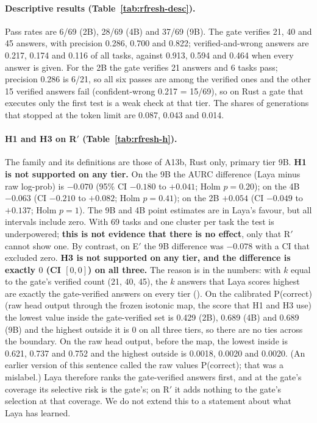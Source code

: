 \documentclass[11pt,a4paper]{article}
\newcommand{\code}[1]{\texttt{\detokenize{#1}}}
\begin{document}
\paragraph{Descriptive results (Table~\ref{tab:rfresh-desc}).} Pass rates are 6/69 (2B), 28/69 (4B) and 37/69 (9B). The gate verifies 21, 40 and 45 answers, with precision 0.286, 0.700 and 0.822; verified-and-wrong answers are 0.217, 0.174 and 0.116 of all tasks, against 0.913, 0.594 and 0.464 when every answer is given. For the 2B the gate verifies 21 answers and 6 tasks pass; precision 0.286 is 6/21, so all six passes are among the verified ones and the other 15 verified answers fail (confident-wrong 0.217 = 15/69), so on Rust a gate that executes only the first test is a weak check at that tier. The shares of generations that stopped at the token limit are 0.087, 0.043 and 0.014.

\paragraph{H1 and H3 on R$'$ (Table~\ref{tab:rfresh-h}).} The family and its definitions are those of A13b, Rust only, primary tier 9B. \textbf{H1 is not supported on any tier.} On the 9B the AURC difference (Laya minus raw log-prob) is $-0.070$ (95\% CI $-0.180$ to $+0.041$; Holm $p=0.20$); on the 4B $-0.063$ (CI $-0.210$ to $+0.082$; Holm $p=0.41$); on the 2B $+0.054$ (CI $-0.049$ to $+0.137$; Holm $p=1$). The 9B and 4B point estimates are in Laya's favour, but all intervals include zero. With 69 tasks and one cluster per task the test is underpowered; \textbf{this is not evidence that there is no effect}, only that R$'$ cannot show one. By contrast, on E$'$ the 9B difference was $-0.078$ with a CI that excluded zero.
\textbf{H3 is not supported on any tier, and the difference is exactly $0$ (CI $[0,0]$) on all three.} The reason is in the numbers: with $k$ equal to the gate's verified count (21, 40, 45), the $k$ answers that Laya scores highest are exactly the gate-verified answers on every tier (\code{rfresh_gate_laya_overlap.json}). On the calibrated P(correct) (raw head output through the frozen isotonic map, the score that H1 and H3 use) the lowest value inside the gate-verified set is 0.429 (2B), 0.689 (4B) and 0.689 (9B) and the highest outside it is 0 on all three tiers, so there are no ties across the boundary. On the raw head output, before the map, the lowest inside is 0.621, 0.737 and 0.752 and the highest outside is 0.0018, 0.0020 and 0.0020. (An earlier version of this sentence called the raw values P(correct); that was a mislabel.) Laya therefore ranks the gate-verified answers first, and at the gate's coverage its selective risk is the gate's; on R$'$ it adds nothing to the gate's selection at that coverage. We do not extend this to a statement about what Laya has learned.
\end{document}
